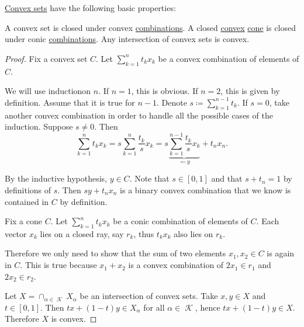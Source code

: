 \begin{proposition}\label{thm:convex_set_properties}
  \hyperref[def:convex_set]{Convex sets} have the following basic properties:

  \begin{propenum}
     A convex set is closed under convex \hyperref[def:linear_combination/convex]{combinations}.
     A closed \hyperref[def:convex_set]{convex} \hyperref[def:geometric_cone]{cone} is closed under conic \hyperref[def:linear_combination/conic]{combinations}.
     Any intersection of convex sets is convex.
  \end{propenum}
\end{proposition}
\begin{proof}
   Fix a convex set \( C \). Let \( \sum_{k=1}^n t_k x_k \) be a convex combination of elements of \( C \).

  We will use induction\IND on \( n \). If \( n = 1 \), this is obvious. If \( n = 2 \), this is given by definition. Assume that it is true for \( n - 1 \). Denote \( s \coloneqq \sum_{k=1}^{n-1} t_k \). If \( s = 0 \), take another convex combination in order to handle all the possible cases of the induction\IND. Suppose \( s \neq 0 \). Then
  \begin{equation*}
    \sum_{k=1}^n t_k x_k
    =
    s \sum_{k=1}^n \frac {t_k} s x_k
    =
    s \underbrace{\sum_{k=1}^{n-1} \frac {t_k} s x_k}_{\eqqcolon y} + t_n x_n.
  \end{equation*}

  By the inductive hypothesis, \( y \in C \). Note that \( s \in [0, 1] \) and that \( s + t_n = 1 \) by definitions of \( s \). Then \( s y + t_n x_n \) is a binary convex combination that we know is contained in \( C \) by definition.

   Fix a cone \( C \). Let \( \sum_{k=1}^n t_k x_k \) be a conic combination of elements of \( C \). Each vector \( x_k \) lies on a closed ray, say \( r_k \), thus \( t_k x_k \) also lies on \( r_k \).

  Therefore we only need to show that the sum of two elements \( x_1, x_2 \in C \) is again in \( C \). This is true because \( x_1 + x_2 \) is a convex combination of \( 2x_1 \in r_1 \) and \( 2x_2 \in r_2 \).

   Let \( X = \cap_{\alpha \in \mscrK} X_\alpha \) be an intersection of convex sets. Take \( x, y \in X \) and \( t \in [0, 1] \). Then \( tx + (1-t)y \in X_\alpha \) for all \( \alpha \in \mscrK \), hence \( tx + (1-t)y \in X \). Therefore \( X \) is convex.
\end{proof}

